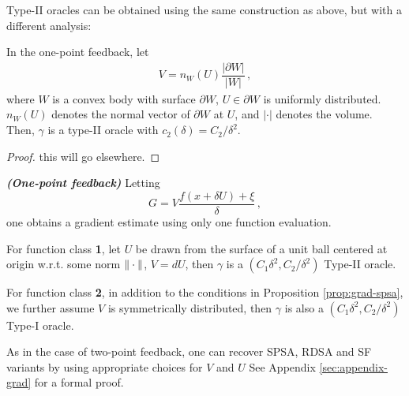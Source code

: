 Type-II oracles can be obtained using the same construction as above, but with a different analysis:
\begin{proposition}
\label{prop:flaxman}
In the one-point feedback, let
\begin{align*}
V = n_W(U)\dfrac{\lvert \partial W\rvert}{\lvert W \rvert}\,,
\end{align*}
where $W$ is a convex body with surface $\partial W$, $U \in \partial W$ is uniformly distributed. $n_W(U)$ denotes the normal vector of $\partial W$ at $U$, and $\lvert \cdot \rvert$ denotes the volume. Then, $\gamma$ is a type-II oracle with $c_2(\delta) = C_2/\delta^2$.
\end{proposition}
\begin{proof}
this will go elsewhere.
\end{proof}
\begin{proposition}\textbf{\textit{(One-point feedback)}}
 Letting
 \[
 G =  V \dfrac{f(x+\delta U) + \xi}{\delta}\,,
 \]
 one obtains a gradient estimate using only one function evaluation.

For function class \textbf{1},  let $U$ be drawn from the surface of a unit ball centered at origin w.r.t. some norm $\|\cdot\|$, $V=dU$, then $\gamma$ is a $(C_1\delta^2, C_2/\delta^2)$ Type-II oracle.

 For function class \textbf{2}, in addition to the conditions in Proposition \ref{prop:grad-spsa}, we further assume $V$ is symmetrically distributed, then $\gamma$ is also a $(C_1\delta^2, C_2/\delta^2)$ Type-I oracle.

\end{proposition}
As in the case of two-point feedback, one can recover SPSA, RDSA and SF variants by using appropriate choices for $V$ and $U$ See Appendix \ref{sec:appendix-grad} for a formal proof.
\fi


